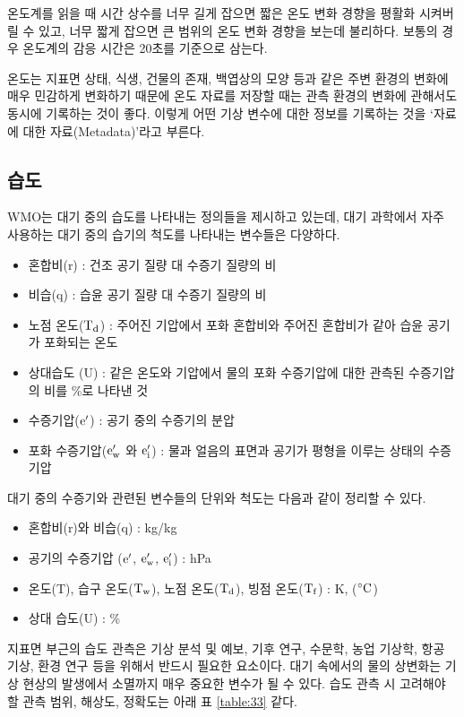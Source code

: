 온도계를 읽을 때 시간 상수를 너무 길게 잡으면 짧은 온도 변화 경향을 평활화 시켜버릴 수 있고, 너무 짧게 잡으면 큰 범위의 온도 변화 경향을 보는데 불리하다. 보통의 경우 온도계의 감응 시간은 20초를 기준으로 삼는다. 

온도는 지표면 상태, 식생, 건물의 존재, 백엽상의 모양 등과 같은 주변 환경의 변화에 매우 민감하게 변화하기 때문에 온도 자료를 저장할 때는 관측 환경의 변화에 관해서도 동시에 기록하는 것이 좋다. 이렇게 어떤 기상 변수에 대한 정보를 기록하는 것을 ‘자료에 대한 자료(Metadata)’라고 부른다.

\subsection{습도}

WMO는 대기 중의 습도를 나타내는 정의들을 제시하고 있는데, 대기 과학에서 자주 사용하는 대기 중의 습기의 척도를 나타내는 변수들은 다양하다.

\begin{itemize}
	\item 혼합비(r) : 건조 공기 질량 대 수증기 질량의 비
	\item 비습(q) : 습윤 공기 질량 대 수증기 질량의 비
	\item 노점 온도($\rm T_d$) : 주어진 기압에서 포화 혼합비와 주어진 혼합비가 같아 습윤 공기가 포화되는 온도
	\item 상대습도 (U) : 같은 온도와 기압에서 물의 포화 수증기압에 대한 관측된 수증기압의 비를 \%로 나타낸 것
	\item 수증기압($\rm e^{\prime}$) : 공기 중의 수증기의 분압
	\item 포화 수증기압($\rm e_w^{\prime}$ 와 $\rm e_i^{\prime}$) : 물과 얼음의 표면과 공기가 평형을 이루는 상태의 수증기압
\end{itemize}
대기 중의 수증기와 관련된 변수들의 단위와 척도는 다음과 같이 정리할 수 있다.
\begin{itemize}
	\item 혼합비(r)와 비습(q) : kg/kg
	\item 공기의 수증기압 ($\rm e ^{\prime}$, $\rm e_w^{\prime}$, $\rm e_i^{\prime}$) : hPa
	\item 온도(T), 습구 온도($\rm T_w$), 노점 온도($\rm T_d$), 빙점 온도($\rm T_f$) : K, ($\rm ^{\circ}C$) 
	\item 상대 습도(U) : \%
\end{itemize}

지표면 부근의 습도 관측은 기상 분석 및 예보, 기후 연구, 수문학, 농업 기상학, 항공 기상, 환경 연구 등을 위해서 반드시 필요한 요소이다. 대기 속에서의 물의 상변화는 기상 현상의 발생에서 소멸까지 매우 중요한 변수가 될 수 있다. 
습도 관측 시 고려해야 할 관측 범위, 해상도, 정확도는 아래 표 \ref{table:33} \과 같다.

